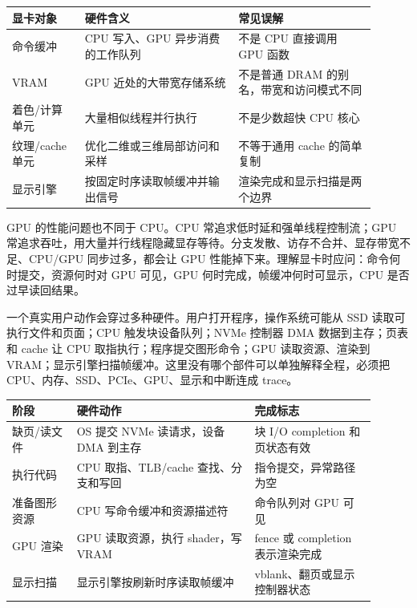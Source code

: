 \begin{longtable}{L{0.18\linewidth}L{0.38\linewidth}L{0.34\linewidth}}
\toprule
显卡对象 & 硬件含义 & 常见误解 \\
\midrule
命令缓冲 & CPU 写入、GPU 异步消费的工作队列 & 不是 CPU 直接调用 GPU 函数 \\\tablerowrule
VRAM & GPU 近处的大带宽存储系统 & 不是普通 DRAM 的别名，带宽和访问模式不同 \\\tablerowrule
着色/计算单元 & 大量相似线程并行执行 & 不是少数超快 CPU 核心 \\\tablerowrule
纹理/cache 单元 & 优化二维或三维局部访问和采样 & 不等于通用 cache 的简单复制 \\\tablerowrule
显示引擎 & 按固定时序读取帧缓冲并输出信号 & 渲染完成和显示扫描是两个边界 \\
\bottomrule
\end{longtable}

GPU 的性能问题也不同于 CPU。CPU 常追求低时延和强单线程控制流；GPU 常追求吞吐，用大量并行线程隐藏显存等待。分支发散、访存不合并、显存带宽不足、CPU/GPU 同步过多，都会让 GPU 性能掉下来。理解显卡时应问：命令何时提交，资源何时对 GPU 可见，GPU 何时完成，帧缓冲何时可显示，CPU 是否过早读回结果。

一个真实用户动作会穿过多种硬件。用户打开程序，操作系统可能从 SSD 读取可执行文件和页面；CPU 触发块设备队列；NVMe 控制器 DMA 数据到主存；页表和 cache 让 CPU 取指执行；程序提交图形命令；GPU 读取资源、渲染到 VRAM；显示引擎扫描帧缓冲。这里没有哪个部件可以单独解释全程，必须把 CPU、内存、SSD、PCIe、GPU、显示和中断连成 trace。

\begin{longtable}{L{0.16\linewidth}L{0.44\linewidth}L{0.3\linewidth}}
\toprule
阶段 & 硬件动作 & 完成标志 \\
\midrule
缺页/读文件 & OS 提交 NVMe 读请求，设备 DMA 到主存 & 块 I/O completion 和页状态有效 \\\tablerowrule
执行代码 & CPU 取指、TLB/cache 查找、分支和写回 & 指令提交，异常路径为空 \\\tablerowrule
准备图形资源 & CPU 写命令缓冲和资源描述符 & 命令队列对 GPU 可见 \\\tablerowrule
GPU 渲染 & GPU 读取资源，执行 shader，写 VRAM & fence 或 completion 表示渲染完成 \\\tablerowrule
显示扫描 & 显示引擎按刷新时序读取帧缓冲 & vblank、翻页或显示控制器状态 \\
\bottomrule
\end{longtable}

